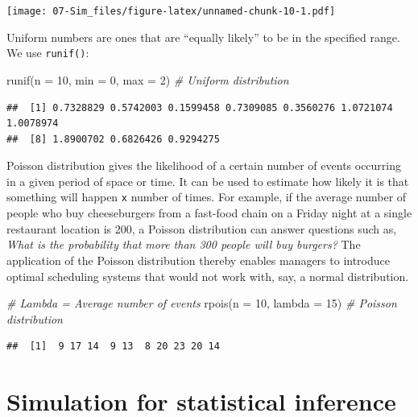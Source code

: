 \documentclass[
]{book}
\newenvironment{Shaded}{\begin{snugshade}}{\end{snugshade}}
\newcommand{\AttributeTok}[1]{\textcolor[rgb]{0.77,0.63,0.00}{#1}}
\newcommand{\CommentTok}[1]{\textcolor[rgb]{0.56,0.35,0.01}{\textit{#1}}}
\newcommand{\DecValTok}[1]{\textcolor[rgb]{0.00,0.00,0.81}{#1}}
\newcommand{\FunctionTok}[1]{\textcolor[rgb]{0.00,0.00,0.00}{#1}}
\newcommand{\NormalTok}[1]{#1}
\begin{document}
\texttt{[image: 07-Sim\_files/figure-latex/unnamed-chunk-10-1.pdf]}

Uniform numbers are ones that are ``equally likely'' to be in the specified range. We use \texttt{runif()}:

\begin{Shaded}
\begin{Highlighting}[]
\FunctionTok{runif}\NormalTok{(}\AttributeTok{n =} \DecValTok{10}\NormalTok{, }\AttributeTok{min =} \DecValTok{0}\NormalTok{, }\AttributeTok{max =} \DecValTok{2}\NormalTok{) }\CommentTok{\# Uniform distribution}
\end{Highlighting}
\end{Shaded}

\begin{verbatim}
##  [1] 0.7328829 0.5742003 0.1599458 0.7309085 0.3560276 1.0721074 1.0078974
##  [8] 1.8900702 0.6826426 0.9294275
\end{verbatim}

Poisson distribution gives the likelihood of a certain number of events occurring in a given period of space or time. It can be used to estimate how likely it is that something will happen \texttt{x} number of times. For example, if the average number of people who buy cheeseburgers from a fast-food chain on a Friday night at a single restaurant location is 200, a Poisson distribution can answer questions such as, \emph{What is the probability that more than 300 people will buy burgers?} The application of the Poisson distribution thereby enables managers to introduce optimal scheduling systems that would not work with, say, a normal distribution.

\begin{Shaded}
\begin{Highlighting}[]
\CommentTok{\# Lambda = Average number of events}
\FunctionTok{rpois}\NormalTok{(}\AttributeTok{n =} \DecValTok{10}\NormalTok{, }\AttributeTok{lambda =} \DecValTok{15}\NormalTok{) }\CommentTok{\# Poisson distribution}
\end{Highlighting}
\end{Shaded}

\begin{verbatim}
##  [1]  9 17 14  9 13  8 20 23 20 14
\end{verbatim}

\hypertarget{simulation-for-statistical-inference}{%
\section{Simulation for statistical inference}\label{simulation-for-statistical-inference}}
\end{document}
